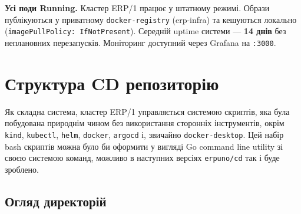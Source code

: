 \documentclass[12pt,a4paper]{article}
\begin{document}
\begin{tcolorbox}[notebox]
\textbf{Усі поди Running.}
Кластер ERP/1 працює у штатному режимі. Образи публікуються у приватному
\texttt{docker-registry} (erp-infra) та кешуються локально (\texttt{imagePullPolicy: IfNotPresent}).
Середній uptime системи --- \textbf{14 днів} без неплановних перезапусків.
Моніторинг доступний через Grafana на \texttt{:3000}.
\end{tcolorbox}

\newpage
\section{Структура CD репозиторію}

Як складна система, кластер ERP/1 управляється системою скриптів, яка була побудована
природнім чином без використання сторонніх інструментів, окрім \texttt{kind}, \texttt{kubectl},
\texttt{helm}, \texttt{docker}, \texttt{argocd} і, звичайно \texttt{docker-desktop}. Цей набір bash скриптів
можна було би оформити у вигляді Go command line utility зі своєю системою команд, можливо в
наступних версіях \texttt{erpuno/cd} так і буде зроблено.

\subsection{Огляд директорій}
\end{document}
